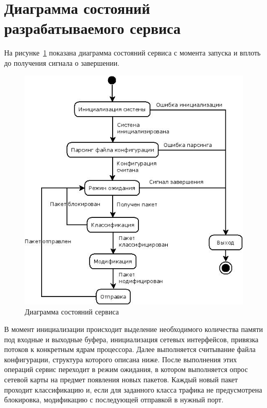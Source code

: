 \section{Диаграмма состояний разрабатываемого сервиса}
На рисунке~\ref{pic:state_diagram} показана диаграмма состояний сервиса с момента запуска и вплоть до получения сигнала о завершении.
\begin{figure}[h]
\centering
\includegraphics[scale=0.6]{pictures/state_diagram}
\caption{Диаграмма состояний сервиса}
\label{pic:state_diagram}
\end{figure}

В момент инициализации происходит выделение необходимого количества памяти под входные и выходные буфера, инициализация сетевых интерфейсов, привязка потоков к конкретным ядрам процессора. Далее выполняется считывание файла конфигурации, структура которого описана ниже. После выполнения этих операций сервис переходит в режим ожидания, в котором выполняется опрос сетевой карты на предмет появления новых пакетов. Каждый новый пакет проходит классификацию и, если для заданного класса трафика не предусмотрена блокировка, модификацию с последующей отправкой в нужный порт.

